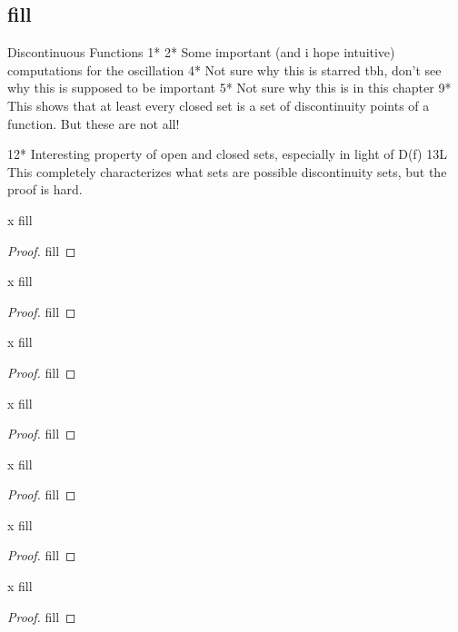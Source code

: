 \subsection{fill}

Discontinuous Functions
1*
2* Some important (and i hope intuitive) computations for the oscillation
4* Not sure why this is starred tbh, don't see why this is supposed to be important
5* Not sure why this is in this chapter
9* This shows that at least every closed set is a set of discontinuity points of a function. But these are not all!

12* Interesting property of open and closed sets, especially in light of D(f)
13L This completely characterizes what sets are possible discontinuity sets, but the proof is hard.

\begin{exercise}{x}
fill
\end{exercise}
\begin{proof}
fill
\end{proof} 

\begin{exercise}{x}
fill
\end{exercise}
\begin{proof}
fill
\end{proof} 

\begin{exercise}{x}
fill
\end{exercise}
\begin{proof}
fill
\end{proof} 

\begin{exercise}{x}
fill
\end{exercise}
\begin{proof}
fill
\end{proof} 

\begin{exercise}{x}
fill
\end{exercise}
\begin{proof}
fill
\end{proof} 

\begin{exercise}{x}
fill
\end{exercise}
\begin{proof}
fill
\end{proof} 

\begin{exercise}{x}
fill
\end{exercise}
\begin{proof}
fill
\end{proof} 

